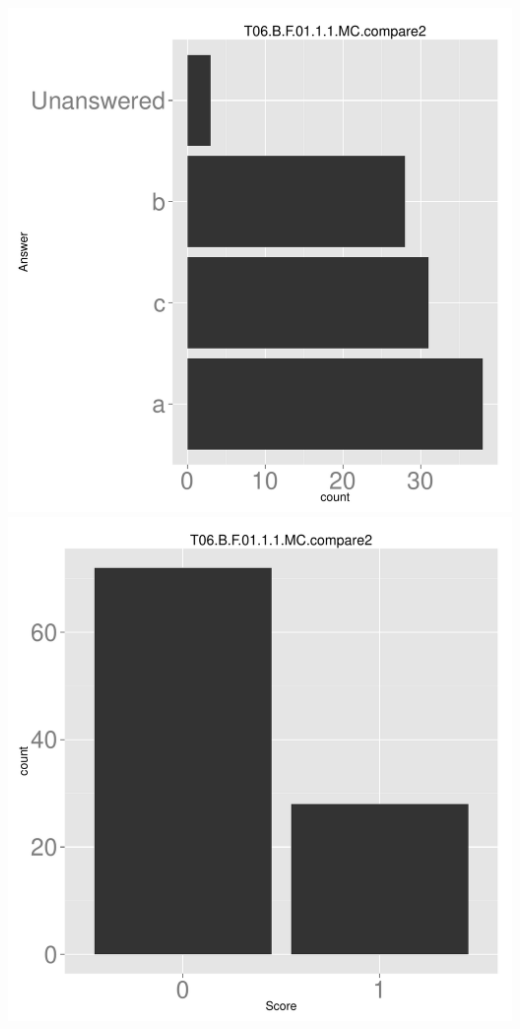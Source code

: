 \documentclass[12pt,nohyper]{tufte-handout}\usepackage[]{graphicx}\usepackage[]{color}
\begin{document}
\begin{center} \includegraphics[width=.45\linewidth]{Topic06_18_answer} \includegraphics[width=.45\linewidth]{Topic06_18_score} \end{center} 
\end{document}
